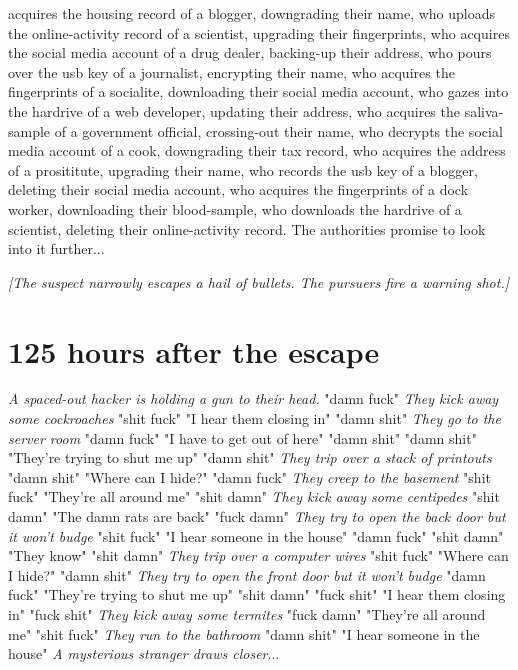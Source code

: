 \documentclass{report}
\begin{document}
acquires the housing record of a blogger, downgrading their name, who uploads the online-activity record of a scientist, upgrading their fingerprints, who acquires the social media account of a drug dealer, backing-up their address, who pours over the usb key of a journalist, encrypting their name, who acquires the fingerprints of a socialite, downloading their social media account, who gazes into the hardrive of a web developer, updating their address, who acquires the saliva-sample of a government official, crossing-out their name, who decrypts the social media account of a cook, downgrading their tax record, who acquires the address of a prosititute, upgrading their name, who records the usb key of a blogger, deleting their social media account, who acquires the fingerprints of a dock worker, downloading their blood-sample, who downloads the hardrive of a scientist, deleting their online-activity record. The authorities promise to look into it further...

\textit{[The suspect narrowly escapes a hail of bullets. The pursuers fire a warning shot.]}


\section*{125 \small{hours after the escape}}

\textit{A spaced-out hacker is holding a gun to their head.} "damn fuck" \textit{They kick away some cockroaches} "shit fuck" "I hear them closing in" "damn shit" \textit{They go to the server room} "damn fuck" "I have to get out of here" "damn shit" \textit{} "damn shit" "They're trying to shut me up" "damn shit" \textit{They trip over a stack of printouts} "damn shit" "Where can I hide?" "damn fuck" \textit{They creep to the basement} "shit fuck" "They're all around me" "shit damn" \textit{They kick away some centipedes} "shit damn" "The damn rats are back" "fuck damn" \textit{They try to open the back door but it won't budge} "shit fuck" "I hear someone in the house" "damn fuck" \textit{} "shit damn" "They know" "shit damn" \textit{They trip over a computer wires} "shit fuck" "Where can I hide?" "damn shit" \textit{They try to open the front door but it won't budge} "damn fuck" "They're trying to shut me up" "shit damn" \textit{} "fuck shit" "I hear them closing in" "fuck shit" \textit{They kick away some termites} "fuck damn" "They're all around me" "shit fuck" \textit{They run to the bathroom} "damn shit" "I hear someone in the house" \textit{A mysterious stranger draws closer}...
\end{document}

